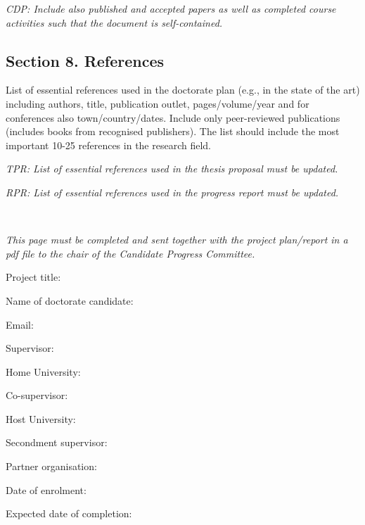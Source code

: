 \documentclass[12pt]{article}
\newcommand{\dottedline}{%
   {\rule{0pt}{5mm}\dotfill\newline}}
\begin{document}
\begin{shaded}
\noindent
\emph{
CDP: Include also published and accepted papers as well as completed course activities such that the document is self-contained.}
\end{shaded}



\subsection*{Section 8. References}

List of essential references used in the doctorate plan (e.g., in the state of the art) including authors, title, publication outlet, pages/volume/year and for conferences also town/country/dates. Include only peer-reviewed publications (includes books from recognised publishers). The list should include the most important 10-25 references in the research field.

\begin{shaded}
\noindent
\emph{TPR: List of essential references used in the thesis proposal must be updated.}

\noindent
\emph{RPR: List of essential references used in the progress report must be updated.}
\end{shaded}

\pagebreak

\noindent{}\\[5mm]

\emph{This page must be completed and sent together with the project
plan/report in a pdf file to the chair of the Candidate Progress Committee.}

\vspace*{3mm}

\noindent
Project title: \dottedline
Name of doctorate candidate: \dottedline
Email: \dottedline
Supervisor: \dottedline
Home University: \dottedline
Co-supervisor: \dottedline
Host University: \dottedline
Secondment supervisor: \dottedline
Partner organisation: \dottedline
Date of enrolment: \dottedline
Expected date of completion: \dottedline
\end{document}
